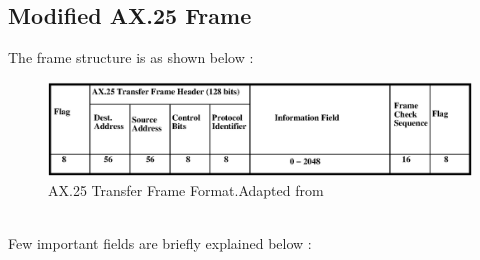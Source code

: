 \documentclass[BTech]{iitmdiss}
\begin{document}
\subsection{Modified AX.25 Frame }
The frame structure is as shown below : 
\newline
\begin{figure}[H]

\includegraphics[scale = 0.65]{ax25main.eps.eps}
\caption{AX.25 Transfer Frame Format.Adapted from ~\cite{ax25}}
\label{fig:AX25mainframe}
\end{figure}
\\Few important  fields are briefly explained below :
\end{document}
